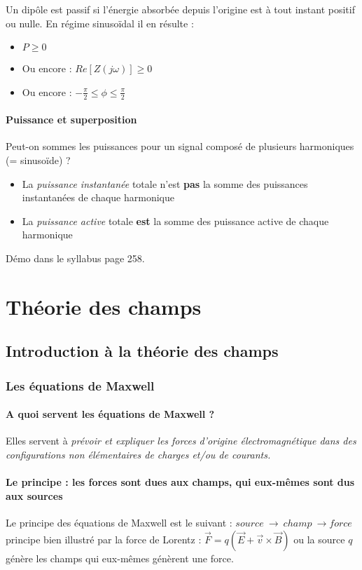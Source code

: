 \documentclass[british,french,11pt, a4paper, openany]{book}
\begin{document}
		Un dipôle est passif si l'énergie absorbée depuis l'origine est à tout instant positif ou  nulle. En régime sinusoïdal il en résulte :
		\begin{itemize}
			\item $P \geq 0$
			\item Ou encore : $Re[Z(j\omega)] \geq 0$
			\item Ou encore : $-\frac{\pi}{2} \leq \phi \leq \frac{\pi}{2}$
		\end{itemize}
		
		\setcounter{subsection}{6}
		\subsection{Puissance et superposition}
		Peut-on sommes les puissances pour un signal composé de plusieurs harmoniques (= sinusoïde) ? 
		\begin{itemize}
			\item La \textit{puissance instantanée} totale n'est \textbf{pas} la somme des puissances instantanées de chaque harmonique
			\item La \textit{puissance active} totale \textbf{est} la somme des puissance active de chaque harmonique
		\end{itemize}
		Démo dans le syllabus page 258.
		
		
		\part{Théorie des champs}
		\setcounter{chapter}{0}
		\chapter{Introduction à la théorie des champs}
		\section{Les équations de Maxwell}
		\subsection{A quoi servent les équations de Maxwell ?}
		Elles servent à \textit{prévoir et expliquer les forces d'origine électromagnétique dans des configurations non élémentaires de charges et/ou de courants.}
		
		\subsection{Le principe : les forces sont dues aux champs, qui eux-mêmes sont dus aux sources}
		Le principe des équations de Maxwell est le suivant : $source\ \rightarrow\ champ\ \rightarrow force$ principe bien illustré par la force de Lorentz : $\vec{F} = q(\vec{E} + \vec{v}\times\vec{B})$ ou la source $q$ génère les champs qui eux-mêmes génèrent une force.\\
		
\end{document}

